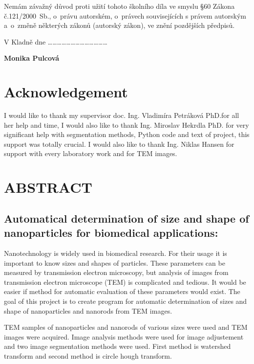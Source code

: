 \documentclass[a4paper,12pt]{article}   %
\numberwithin{equation}{section}        %
\newcommand{\autor}{Monika Pulcová}
\newcommand{\vedouci}{doc. Ing. Vladimíra Petráková PhD.}
\newcommand{\nazevENG}{Automatical determination of size and shape of nanoparticles for biomedical applications}
\begin{document}
    \hspace{-0.75cm}Nemám závažný důvod proti užití tohoto školního díla ve smyslu \S 60 Zákona č.121/2000~Sb., o~právu autorském, o~právech souvisejících s právem autorským a~o~změně některých zákonů (autorský zákon), ve znění pozdějších předpisů. 
    
    \vspace{1em}
    
    \hspace{-0.75cm}V Kladně dne \ldots \ldots \ldots \hfill \ldots \ldots \ldots \ldots \ldots \ldots \ldots \ldots \ldots \ldots

    \hspace{10cm} \textbf{\autor}

	\clearpage
	
	\null\vfill
	\section*{Acknowledgement}
	I would like to thank my supervisor \vedouci for all her help and time, I would also like to thank Ing. Miroslav Hekrdla PhD. for very significant help with segmentation methods, Python code and text of project, this support was totally crucial. I would also like to thank Ing. Niklas Hansen for support with every laboratory work and for TEM images.

    \clearpage	

    	\null\vfill	
	\section*{ABSTRACT}
        \subsection*{\nazevENG:}
		 
       Nanotechnology is widely used in biomedical research. For their usage it is important to know sizes and shapes of particles. These parameters can be measured by transmission electron microscopy, but analysis of images from transmission electron microscope (TEM) is complicated and tedious. It would be easier if method for automatic evaluation of these parameters would exist. The goal of this project is to create program for automatic determination of sizes and shape of nanoparticles and nanorods from TEM images.

       TEM samples of nanoparticles and nanorods of various sizes were used and TEM images were acquired. Image analysis methods were used for image adjustement and two image segmentation methods were used. First method is watershed transform and second method is circle hough transform.
\end{document}
